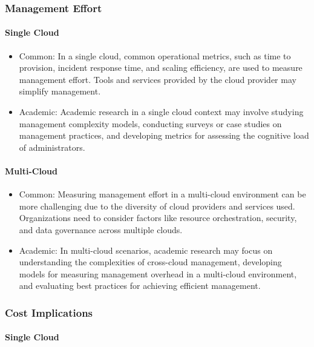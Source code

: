 \subsubsection{Management Effort}

\paragraph{Single Cloud}
\begin{itemize}
    \item Common: In a single cloud, common operational metrics, such as time to provision, incident response time, and scaling efficiency, 
    are used to measure management effort. Tools and services provided by the cloud provider may simplify management.
    \item Academic: Academic research in a single cloud context may involve studying management complexity models, 
    conducting surveys or case studies on management practices, and developing metrics for assessing the cognitive load of administrators.
\end{itemize}

\paragraph{Multi-Cloud}
\begin{itemize}
    \item Common: Measuring management effort in a multi-cloud environment can be more challenging due to the diversity of cloud providers and services used. 
    Organizations need to consider factors like resource orchestration, security, and data governance across multiple clouds.
    \item Academic: In multi-cloud scenarios, academic research may focus on understanding the complexities of cross-cloud management, 
    developing models for measuring management overhead in a multi-cloud environment, and evaluating best practices for achieving efficient management.
\end{itemize}

\subsubsection{Cost Implications}

\paragraph{Single Cloud}

